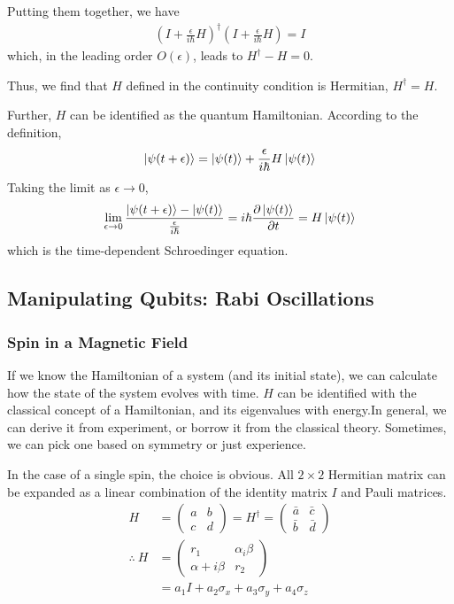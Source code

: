 Putting them together, we have\begin{align*}
    \left( I+\frac{\epsilon}{i\hbar}H \right)^\dagger \left( I+\frac{\epsilon}{i\hbar}H \right)=I
\end{align*}
which, in the leading order $O(\epsilon)$, leads to $H^\dagger -H=0$.

Thus, we find that $H$ defined in the continuity condition is Hermitian, $H^\dagger = H$. 

Further, $H$ can be identified as the quantum Hamiltonian. According to the definition, \begin{align*}
    \ket{\psi(t+\epsilon)}=\ket{\psi(t)}+\frac{\epsilon}{i\hbar}H\ket{\psi(t)}
\end{align*}
Taking the limit as $\epsilon\rightarrow 0$,\begin{align*}
    \lim_{\epsilon \rightarrow 0} \frac{\ket{\psi(t+\epsilon)}-\ket{\psi(t)}}{\frac{\epsilon}{i\hbar}}=i\hbar\frac{\partial \ket{\psi(t)}}{\partial t}=H\ket{\psi(t)}
\end{align*}
which is the time-dependent Schroedinger equation. 


\subsection{Manipulating Qubits: Rabi Oscillations}

\subsubsection{Spin in a Magnetic Field}
If we know the Hamiltonian of a system (and its initial state), we can calculate how the state of the system evolves with time. $H$ can be identified with the classical concept of a Hamiltonian, and its eigenvalues with energy.In general, we can derive it from experiment, or borrow it from the classical theory. Sometimes, we can pick one based on symmetry or just experience.

In the case of a single spin, the choice is obvious. All $2\times 2$ Hermitian matrix can be expanded as a linear combination of the identity matrix $I$ and Pauli matrices.
\begin{align*}
    H&=\begin{pmatrix}
        a & b\\c&d
    \end{pmatrix}=H^\dagger=\begin{pmatrix}
        \bar{a} & \bar{c}\\\bar{b}&\bar{d}
    \end{pmatrix}\\
    \therefore\ H&=\begin{pmatrix}
        r_1 & \alpha_i\beta\\ \alpha+i\beta & r_2
    \end{pmatrix}\\
    &=a_1 I +a_2 \sigma_x+a_3 \sigma_y+a_4 \sigma_z
\end{align*}

